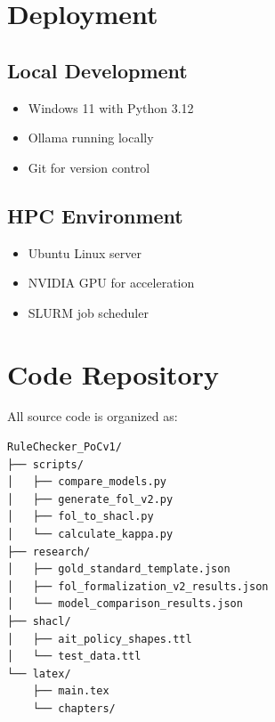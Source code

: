 \section{Deployment}

\subsection{Local Development}

\begin{itemize}
    \item Windows 11 with Python 3.12
    \item Ollama running locally
    \item Git for version control
\end{itemize}

\subsection{HPC Environment}

\begin{itemize}
    \item Ubuntu Linux server
    \item NVIDIA GPU for acceleration
    \item SLURM job scheduler
\end{itemize}

\section{Code Repository}

All source code is organized as:

\begin{verbatim}
RuleChecker_PoCv1/
├── scripts/
│   ├── compare_models.py
│   ├── generate_fol_v2.py
│   ├── fol_to_shacl.py
│   └── calculate_kappa.py
├── research/
│   ├── gold_standard_template.json
│   ├── fol_formalization_v2_results.json
│   └── model_comparison_results.json
├── shacl/
│   ├── ait_policy_shapes.ttl
│   └── test_data.ttl
└── latex/
    ├── main.tex
    └── chapters/
\end{verbatim}
